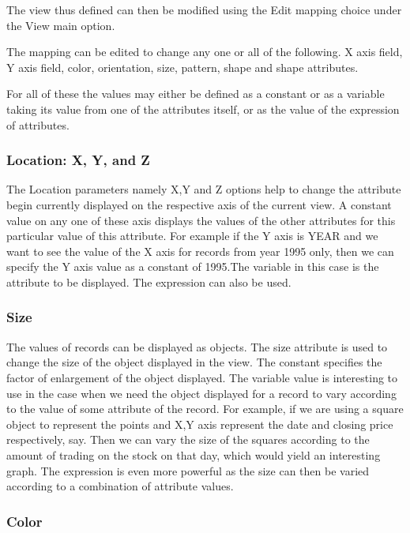 The view thus defined can then be modified using the Edit mapping choice under the View main option.

The mapping can be edited to change any one or all of the following.
X axis field, Y axis field, color, orientation, size, pattern, shape and shape attributes.

For all of these the values may either be defined as a constant or as a variable taking its value from one of the attributes itself, or as the value of the  expression of attributes.

\subsubsection{Location: X, Y, and Z}

The Location parameters namely X,Y and Z options help to change the attribute begin currently displayed on the respective axis of the current view. A constant value on any one of these axis displays the values of the other attributes for this  particular value of this attribute. For example if the Y axis is YEAR and we want to see the value of the X axis for records from year 1995 only, then we can specify the Y axis value as a constant of 1995.The variable in this case is the attribute to be displayed. The expression can also be used.


\subsubsection{Size}

The values of records can be displayed as objects. The size attribute is used to change the size of the object displayed in the view. The constant specifies the factor of enlargement of the object displayed. The variable value is interesting to use in the case when we need the object displayed for a record to vary according to the value of some attribute of the record. For example, if we are using a square object to represent the points and X,Y axis represent the date and closing price  respectively, say. Then we can vary the size of the squares according to the amount of trading on the stock on that day, which would yield an interesting graph. The expression is even more powerful as the size can then be varied according to a combination of attribute values.

\subsubsection{Color}


